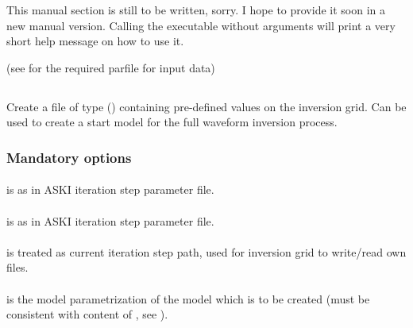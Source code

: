 This manual section is still to be written, sorry. I hope to provide it soon in a new manual version. %
Calling the executable without arguments will print a very short help message on how to use it.

(see  for the required parfile for  input data)
%
\subsection{} \label{programs_scripts,sec:bin_prog,sec:create_startmod_kim}
 Create a file of type  () containing pre-defined values on the inversion grid. Can be used to create a start model for the full waveform inversion process.

\subsubsection{Mandatory options}
\paragraph{}
 is  as in ASKI iteration step parameter file.
\paragraph{}
 is  as in ASKI iteration step parameter file.
\paragraph{}
 is treated as current iteration step path, used for inversion grid to write/read own files.
\paragraph{}
 is the model parametrization of the model which is to be created (must be consistent with content of , see ).
